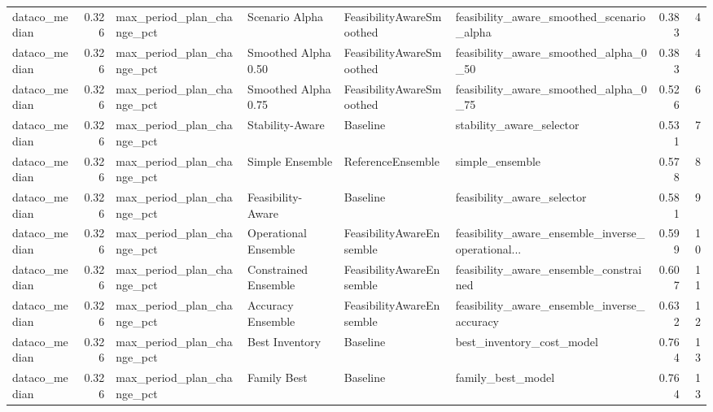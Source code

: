 \begin{table}
{\begin{tabular}{lrllllrr}
 dataco\_median &             0.326 &  max\_period\_plan\_change\_pct &        Scenario Alpha &  FeasibilityAwareSmoothed &          feasibility\_aware\_smoothed\_scenario\_alpha &         0.383 &               4 \\
 dataco\_median &             0.326 &  max\_period\_plan\_change\_pct &   Smoothed Alpha 0.50 &  FeasibilityAwareSmoothed &              feasibility\_aware\_smoothed\_alpha\_0\_50 &         0.383 &               4 \\
 dataco\_median &             0.326 &  max\_period\_plan\_change\_pct &   Smoothed Alpha 0.75 &  FeasibilityAwareSmoothed &              feasibility\_aware\_smoothed\_alpha\_0\_75 &         0.526 &               6 \\
 dataco\_median &             0.326 &  max\_period\_plan\_change\_pct &       Stability-Aware &                  Baseline &                           stability\_aware\_selector &         0.531 &               7 \\
 dataco\_median &             0.326 &  max\_period\_plan\_change\_pct &       Simple Ensemble &         ReferenceEnsemble &                                    simple\_ensemble &         0.578 &               8 \\
 dataco\_median &             0.326 &  max\_period\_plan\_change\_pct &     Feasibility-Aware &                  Baseline &                         feasibility\_aware\_selector &         0.581 &               9 \\
 dataco\_median &             0.326 &  max\_period\_plan\_change\_pct &  Operational Ensemble &  FeasibilityAwareEnsemble &  feasibility\_aware\_ensemble\_inverse\_operational... &         0.599 &              10 \\
 dataco\_median &             0.326 &  max\_period\_plan\_change\_pct &  Constrained Ensemble &  FeasibilityAwareEnsemble &             feasibility\_aware\_ensemble\_constrained &         0.607 &              11 \\
 dataco\_median &             0.326 &  max\_period\_plan\_change\_pct &     Accuracy Ensemble &  FeasibilityAwareEnsemble &        feasibility\_aware\_ensemble\_inverse\_accuracy &         0.632 &              12 \\
 dataco\_median &             0.326 &  max\_period\_plan\_change\_pct &        Best Inventory &                  Baseline &                          best\_inventory\_cost\_model &         0.764 &              13 \\
 dataco\_median &             0.326 &  max\_period\_plan\_change\_pct &           Family Best &                  Baseline &                                  family\_best\_model &         0.764 &              13 \\

\end{tabular}}
\end{table}
